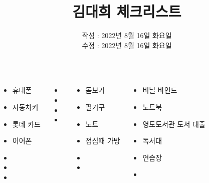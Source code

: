 \documentclass[	20pt, 
							a1paper, 
							portrait, %
							margin=0mm, %
							innermargin=10mm,  		%
							colspace=5mm, 
							subcolspace=0mm
							]{tikzposter}
\title{김대희 체크리스트 }
\author{ 	작성 : 2022년 8월 16일 화요일 \\
				수정 : 2022년 8월 16일 화요일 }
\begin{document}
	\maketitle

	\begin{columns}


			{
				\begin{LARGE}
					\begin{itemize}
					\item 휴대폰
					\item 자동차키
					\item 롯데 카드
					\item 이어폰
					\item 
					\item 
					\item 
					\end{itemize}
				\end{LARGE}
			}


			{
				\begin{LARGE}
					\begin{itemize}
					\item 
					\item 
					\item 
					\item 
					\end{itemize}
				\end{LARGE}
			}

			{
				\begin{LARGE}
					\begin{itemize}
					\item 돋보기
					\item 필기구
					\item 노트
					\item 점심때 가방
					\item 
					\item 

					\end{itemize}
				\end{LARGE}
			}

			{
				\begin{LARGE}
					\begin{itemize}
					\item 비닐 바인드
					\item 노트북
					\item 영도도서관 도서 대출
					\item 독서대
					\item 연습장
					\item 


\end{itemize}
\end{LARGE}}
\end{columns}
\end{document}
